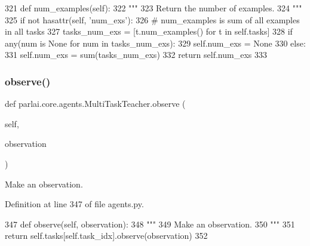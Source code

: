 \begin{DoxyCode}
321     \textcolor{keyword}{def }num\_examples(self):
322         \textcolor{stringliteral}{"""}
323 \textcolor{stringliteral}{        Return the number of examples.}
324 \textcolor{stringliteral}{        """}
325         \textcolor{keywordflow}{if} \textcolor{keywordflow}{not} hasattr(self, \textcolor{stringliteral}{'num\_exs'}):
326             \textcolor{comment}{# num\_examples is sum of all examples in all tasks}
327             tasks\_num\_exs = [t.num\_examples() \textcolor{keywordflow}{for} t \textcolor{keywordflow}{in} self.tasks]
328             \textcolor{keywordflow}{if} any(num \textcolor{keywordflow}{is} \textcolor{keywordtype}{None} \textcolor{keywordflow}{for} num \textcolor{keywordflow}{in} tasks\_num\_exs):
329                 self.num\_exs = \textcolor{keywordtype}{None}
330             \textcolor{keywordflow}{else}:
331                 self.num\_exs = sum(tasks\_num\_exs)
332         \textcolor{keywordflow}{return} self.num\_exs
333 
\end{DoxyCode}
\mbox{\label{classparlai_1_1core_1_1agents_1_1MultiTaskTeacher_a42290221cabd0f1ca21cb87a2228af10}} 
\subsubsection{\texorpdfstring{observe()}{observe()}}
{\footnotesize\ttfamily def parlai.\+core.\+agents.\+Multi\+Task\+Teacher.\+observe (\begin{DoxyParamCaption}\item[{}]{self,  }\item[{}]{observation }\end{DoxyParamCaption})}

\begin{DoxyVerb}Make an observation.
\end{DoxyVerb}
 

Definition at line 347 of file agents.\+py.


\begin{DoxyCode}
347     \textcolor{keyword}{def }observe(self, observation):
348         \textcolor{stringliteral}{"""}
349 \textcolor{stringliteral}{        Make an observation.}
350 \textcolor{stringliteral}{        """}
351         \textcolor{keywordflow}{return} self.tasks[self.task\_idx].observe(observation)
352 
\end{DoxyCode}
\mbox{\label{classparlai_1_1core_1_1agents_1_1MultiTaskTeacher_ac93a499c6438ee1b57d0ad6a702851ae}} 
